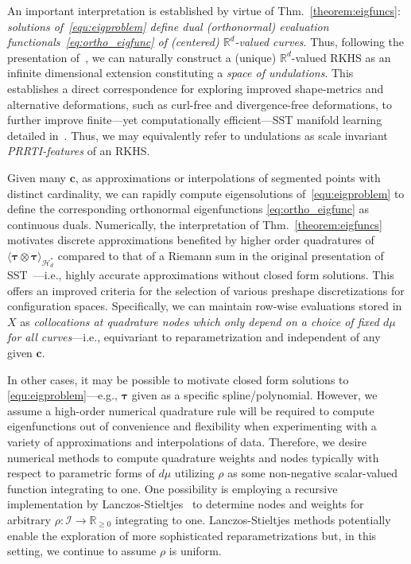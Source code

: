 \documentclass[pdflatex,iicol]{sn-jnl}%
\theoremstyle{thmstyleone}%
\theoremstyle{thmstyletwo}%
\theoremstyle{thmstylethree}%
\begin{document}
An important interpretation is established by virtue of Thm.~\ref{theorem:eigfuncs}: \emph{solutions of~\eqref{equ:eigproblem} define dual (orthonormal) evaluation functionals~\eqref{eq:ortho_eigfunc} of (centered) $\mathbb{R}^d$-valued curves}. Thus, following the presentation of~\cite{micheli2013matrix}, we can naturally construct a (unique) $\mathbb{R}^d$-valued RKHS as an infinite dimensional extension constituting a \textit{space of undulations}. This establishes a direct correspondence for exploring improved shape-metrics and alternative deformations, such as curl-free and divergence-free deformations, to further improve finite---yet computationally efficient---SST manifold learning detailed in~\cite{grey2023separable}. Thus, we may equivalently refer to undulations as scale invariant \emph{PRRTI-features} of an RKHS.

Given many $\boldsymbol{c}$, as approximations or interpolations of segmented points with distinct cardinality, we can rapidly compute eigensolutions of~\eqref{equ:eigproblem} to define the corresponding orthonormal eigenfunctions \eqref{eq:ortho_eigfunc} as continuous duals. Numerically, the interpretation of Thm.~\ref{theorem:eigfuncs} motivates discrete approximations benefited by higher order quadratures of $\langle \boldsymbol{\tau} \otimes \boldsymbol{\tau}\rangle_{\mathcal{H}^*_d}$ compared to that of a Riemann sum in the original presentation of SST~\cite{grey2023separable}---i.e., highly accurate approximations without closed form solutions. This offers an improved criteria for the selection of various preshape discretizations for configuration spaces. Specifically, we can maintain row-wise evaluations stored in $X$ as \textit{collocations at quadrature nodes which only depend on a choice of fixed $d\mu$ for all curves}---i.e., equivariant to reparametrization and independent of any given $\boldsymbol{c}$.

In other cases, it may be possible to motivate closed form solutions to \eqref{equ:eigproblem}---e.g., $\boldsymbol{\tau}$ given as a specific spline/polynomial. However, we assume a high-order numerical quadrature rule will be required to compute eigenfunctions out of convenience and flexibility when experimenting with a variety of approximations and interpolations of data. Therefore, we desire numerical methods to compute quadrature weights and nodes typically with respect to parametric forms of $d\mu$ utilizing $\rho$ as some non-negative scalar-valued function integrating to one. One possibility is employing a recursive implementation by Lanczos-Stieltjes~\cite{gautschi1982generating,glaws2019gauss, constantine2012lanczos} to determine nodes and weights for arbitrary $\rho:\mathcal{I} \rightarrow \mathbb{R}_{\geq 0}$ integrating to one. Lanczos-Stieltjes methods potentially enable the exploration of more sophisticated reparametrizations but, in this setting, we continue to assume $\rho$ is uniform.
\end{document}
